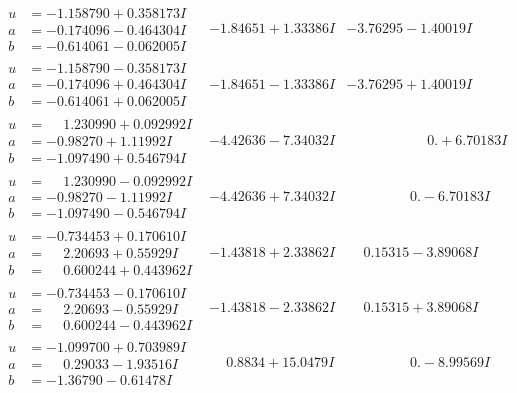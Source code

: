 \documentclass[1p]{elsarticle_modified}
\theoremstyle{definition}
\begin{document}
$$\begin{array}{c|c|c}
\begin{aligned}
u &= -1.158790 + 0.358173 I \\
a &= -0.174096 - 0.464304 I \\
b &= -0.614061 - 0.062005 I\end{aligned}
 & -1.84651 + 1.33386 I & -3.76295 - 1.40019 I \\ \hline\begin{aligned}
u &= -1.158790 - 0.358173 I \\
a &= -0.174096 + 0.464304 I \\
b &= -0.614061 + 0.062005 I\end{aligned}
 & -1.84651 - 1.33386 I & -3.76295 + 1.40019 I \\ \hline\begin{aligned}
u &= \phantom{-}1.230990 + 0.092992 I \\
a &= -0.98270 + 1.11992 I \\
b &= -1.097490 + 0.546794 I\end{aligned}
 & -4.42636 - 7.34032 I & \phantom{-0.000000 -}0. + 6.70183 I \\ \hline\begin{aligned}
u &= \phantom{-}1.230990 - 0.092992 I \\
a &= -0.98270 - 1.11992 I \\
b &= -1.097490 - 0.546794 I\end{aligned}
 & -4.42636 + 7.34032 I & \phantom{-0.000000 } 0. - 6.70183 I \\ \hline\begin{aligned}
u &= -0.734453 + 0.170610 I \\
a &= \phantom{-}2.20693 + 0.55929 I \\
b &= \phantom{-}0.600244 + 0.443962 I\end{aligned}
 & -1.43818 + 2.33862 I & \phantom{-}0.15315 - 3.89068 I \\ \hline\begin{aligned}
u &= -0.734453 - 0.170610 I \\
a &= \phantom{-}2.20693 - 0.55929 I \\
b &= \phantom{-}0.600244 - 0.443962 I\end{aligned}
 & -1.43818 - 2.33862 I & \phantom{-}0.15315 + 3.89068 I \\ \hline\begin{aligned}
u &= -1.099700 + 0.703989 I \\
a &= \phantom{-}0.29033 - 1.93516 I \\
b &= -1.36790 - 0.61478 I\end{aligned}
 & \phantom{-}0.8834 + 15.0479 I & \phantom{-0.000000 } 0. - 8.99569 I \\ \hline\begin{aligned}

\end{aligned}
\end{array}$$
\end{document}
